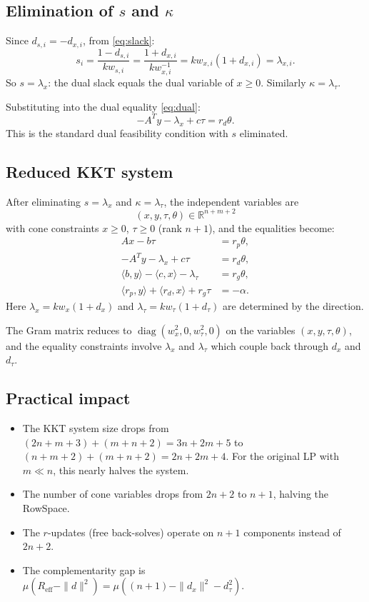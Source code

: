 \documentclass{article}
\newcommand{\R}{\mathbb{R}}
\newcommand{\ip}[2]{\langle #1, #2 \rangle}
\newcommand{\diag}{\operatorname{diag}}
\begin{document}
\subsection{Elimination of $s$ and $\kappa$}

Since $d_{s,i} = -d_{x,i}$, from \eqref{eq:slack}:
\[
  s_i = \frac{1 - d_{s,i}}{k w_{s,i}} = \frac{1 + d_{x,i}}{k w_{x,i}^{-1}} = k w_{x,i}(1 + d_{x,i}) = \lambda_{x,i}.
\]
So \textbf{$s = \lambda_x$}: the dual slack equals the dual variable of $x \geq 0$. Similarly $\kappa = \lambda_\tau$.

Substituting into the dual equality \eqref{eq:dual}:
\[
  -A^T y - \lambda_x + c\tau = r_d \theta.
\]
This is the standard dual feasibility condition with $s$ eliminated.

\subsection{Reduced KKT system}

After eliminating $s = \lambda_x$ and $\kappa = \lambda_\tau$, the independent variables are
\[
  (x, y, \tau, \theta) \in \R^{n + m + 2}
\]
with cone constraints $x \geq 0$, $\tau \geq 0$ (rank $n + 1$), and the equalities become:
\begin{align}
  Ax - b\tau &= r_p \theta, \\
  -A^T y - \lambda_x + c\tau &= r_d \theta, \\
  \ip{b}{y} - \ip{c}{x} - \lambda_\tau &= r_g \theta, \\
  \ip{r_p}{y} + \ip{r_d}{x} + r_g \tau &= -\alpha.
\end{align}
Here $\lambda_x = k w_x (1 + d_x)$ and $\lambda_\tau = k w_\tau (1 + d_\tau)$ are determined by the direction.

The Gram matrix reduces to $\diag(w_x^2, 0, w_\tau^2, 0)$ on the variables $(x, y, \tau, \theta)$, and the equality constraints involve $\lambda_x$ and $\lambda_\tau$ which couple back through $d_x$ and $d_\tau$.

\subsection{Practical impact}

\begin{itemize}
  \item The KKT system size drops from $(2n + m + 3) + (m + n + 2) = 3n + 2m + 5$ to $(n + m + 2) + (m + n + 2) = 2n + 2m + 4$. For the original LP with $m \ll n$, this nearly halves the system.
  \item The number of cone variables drops from $2n + 2$ to $n + 1$, halving the RowSpace.
  \item The $r$-updates (free back-solves) operate on $n + 1$ components instead of $2n + 2$.
  \item The complementarity gap is $\mu(R_{\text{eff}} - \|d\|^2) = \mu((n+1) - \|d_x\|^2 - d_\tau^2)$.
\end{itemize}
\end{document}
